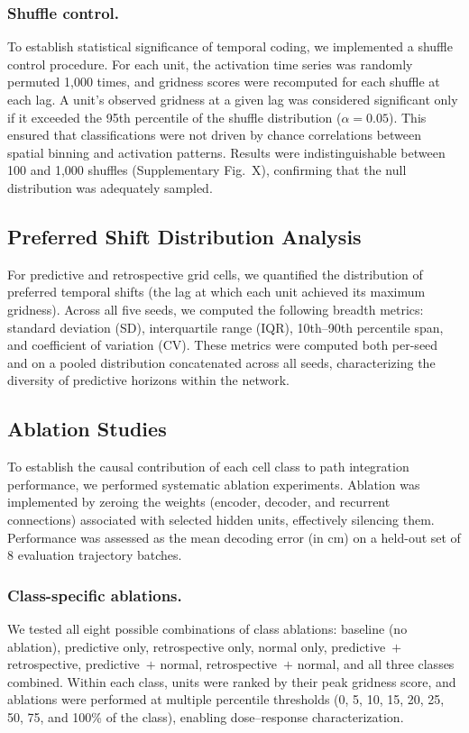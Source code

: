 \documentclass[11pt]{article}
\begin{document}
\subsubsection*{Shuffle control.}
To establish statistical significance of temporal coding, we implemented a shuffle control procedure. For each unit, the activation time series was randomly permuted 1{,}000 times, and gridness scores were recomputed for each shuffle at each lag. A unit's observed gridness at a given lag was considered significant only if it exceeded the 95th percentile of the shuffle distribution ($\alpha = 0.05$). This ensured that classifications were not driven by chance correlations between spatial binning and activation patterns. Results were indistinguishable between 100 and 1{,}000 shuffles (Supplementary Fig.~X), confirming that the null distribution was adequately sampled.


\subsection*{Preferred Shift Distribution Analysis}

For predictive and retrospective grid cells, we quantified the distribution of preferred temporal shifts (the lag at which each unit achieved its maximum gridness). Across all five seeds, we computed the following breadth metrics: standard deviation (SD), interquartile range (IQR), 10th--90th percentile span, and coefficient of variation (CV). These metrics were computed both per-seed and on a pooled distribution concatenated across all seeds, characterizing the diversity of predictive horizons within the network.


\subsection*{Ablation Studies}

To establish the causal contribution of each cell class to path integration performance, we performed systematic ablation experiments. Ablation was implemented by zeroing the weights (encoder, decoder, and recurrent connections) associated with selected hidden units, effectively silencing them. Performance was assessed as the mean decoding error (in cm) on a held-out set of 8 evaluation trajectory batches.

\subsubsection*{Class-specific ablations.}
We tested all eight possible combinations of class ablations: baseline (no ablation), predictive only, retrospective only, normal only, predictive~$+$ retrospective, predictive~$+$ normal, retrospective~$+$ normal, and all three classes combined. Within each class, units were ranked by their peak gridness score, and ablations were performed at multiple percentile thresholds (0, 5, 10, 15, 20, 25, 50, 75, and 100\% of the class), enabling dose--response characterization.
\end{document}

